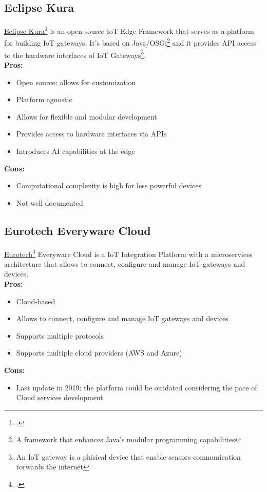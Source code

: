 \subsection{Eclipse Kura}
\label{kura}
\href{https://eclipse.dev/kura/}{Eclipse Kura}\footcite{site:kura} is an open-source IoT Edge Framework that serves as a platform for building IoT gateways.
It's based on Java/OSGi\footnote{A framework that enhances Java's modular programming capabilities} and it provides API access to the hardware interfaces of IoT Gateways\footnote{An IoT gateway is a phisical device that enable sensors communication torwards the internet}.\\
\textbf{Pros:}
\begin{itemize}
    \item Open source: allows for customization
    \item Platform agnostic
    \item Allows for flexible and modular development
    \item Provides access to hardware interfaces via APIs
    \item Introduces AI capabilities at the edge
\end{itemize}
\textbf{Cons:}  
\begin{itemize}
    \item Computational complexity is high for less powerful devices
    \item Not well documented
\end{itemize}

\subsection{Eurotech Everyware Cloud}
\label{everyware-cloud}
\href{https://www.eurotech.com/}{Eurotech}\footcite{site:eurotech} Everyware Cloud is a IoT Integration Platform with a microservices architecture that allows to connect, configure and manage IoT gateways and devices.\\
\textbf{Pros:}
\begin{itemize}
    \item Cloud-based
    \item Allows to connect, configure and manage IoT gateways and devices
    \item Supports multiple protocols
    \item Supports multiple cloud providers (AWS and Azure)
\end{itemize}
\textbf{Cons:}
\begin{itemize}
    \item Last update in 2019: the platform could be outdated considering the pace of Cloud services development
\end{itemize}

